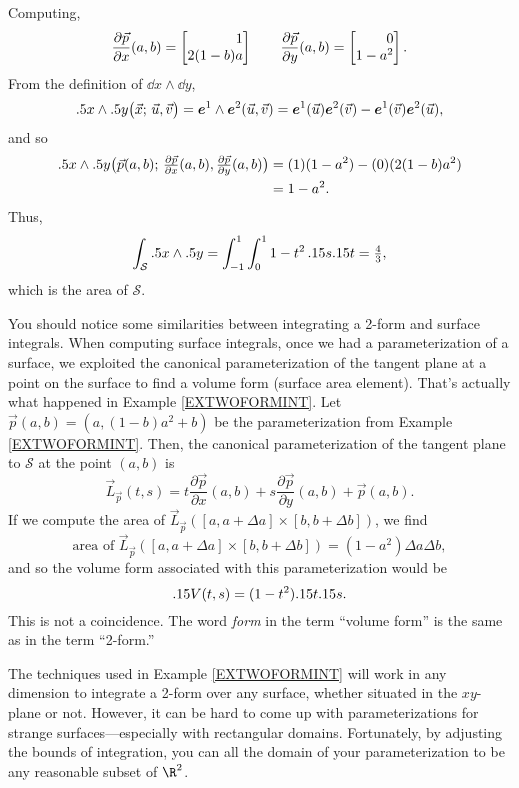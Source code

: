 \begin{example}
	Computing, 
	\[
	\frac{\partial \vec p}{\partial x} (a,b) = \mat{1\\ 2(1-b)a} \qquad
	\frac{\partial \vec p}{\partial y} (a,b) = \mat{0\\ 1-a^2}.
	\]
	From the definition of $\dd x\wedge \dd y$,
	\[
		.5 x\wedge .5 y\big(\vec x;\, \vec u,\vec v\big)
		=\bm e^1\wedge \bm e^2(\vec u,\vec v)
		= \bm e^1(\vec u)\bm e^2(\vec v) - \bm e^1(\vec v)\bm e^2(\vec u),
	\]
	and so
	\begin{align*}
	.5 x\wedge .5 y\big(\vec p(a,b);\, \tfrac{\partial \vec p}{\partial x}(a,b),
		\tfrac{\partial\vec p}{\partial y}(a,b)\big)
		&=(1)(1-a^2) - (0)(2(1-b)a^2)\\ &= 1-a^2.
	\end{align*}
	Thus, 
	\[
		\int_{\mathcal S} .5 x\wedge .5 y = \int_{-1}^1\int_0^1
		1-t^2\,.15 s.15 t = \tfrac{4}{3},
	\]
	which is the area of $\mathcal S$.
\end{example}

You should notice some similarities between integrating a 2-form and surface
integrals.  When computing surface integrals, once we had a parameterization
of a surface, we exploited the canonical
parameterization of the tangent plane at a point on the surface to find
a volume form (surface area element).  That's actually what happened in
Example \ref{EXTWOFORMINT}.  Let $\vec p(a,b)=(a, (1-b)a^2+b)$ be the parameterization
from Example \ref{EXTWOFORMINT}.  Then, the canonical
parameterization of the tangent plane to $\mathcal S$ at the point $(a,b)$ is
\[
	\vec L_{\vec p}(t,s) = t\frac{\partial \vec p}{\partial x}(a,b)+
		s\frac{\partial\vec p}{\partial y}(a,b) + \vec p(a,b).
\]
If we compute the area of $\vec L_{\vec p}([a,a+\Delta a]\times [b,b+\Delta b])$,
we find
\[
	\text{area of }\vec L_{\vec p}([a,a+\Delta a]\times [b,b+\Delta b])
	= (1-a^2)\Delta a\Delta b,
\]
and so the volume form associated with this parameterization would be \[.15 V(t,s) 
= (1-t^2).15 t.15 s.\]
This is not a coincidence.  The word \emph{form} in the term ``volume form''
is the same as in the term ``2-form.''

The techniques used in Example \ref{EXTWOFORMINT} will work in any dimension
to integrate a 2-form over any surface, whether situated in the $xy$-plane or not.
However, it can be hard to come up
with parameterizations for strange surfaces---especially with rectangular domains.
Fortunately, by adjusting the bounds of integration, you can all the domain
of your parameterization to be any reasonable subset of $\R^2$.

